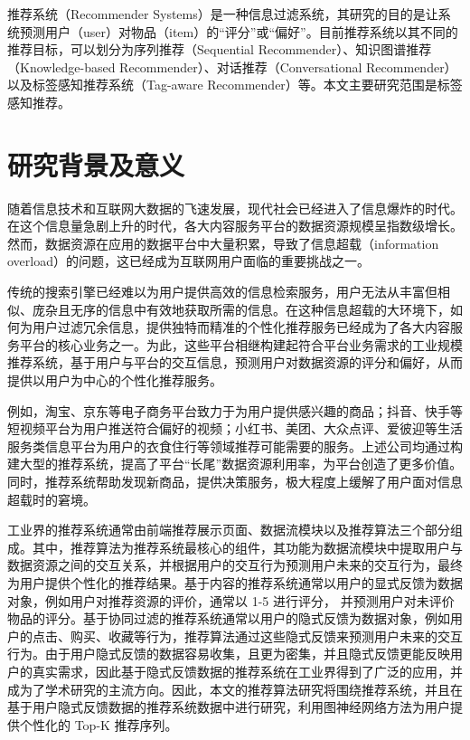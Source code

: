 推荐系统（Recommender Systems）是一种信息过滤系统，其研究的目的是让系统预测用户（user）对物品（item）的“评分”或“偏好”。目前推荐系统以其不同的推荐目标，可以划分为序列推荐（Sequential Recommender）、知识图谱推荐（Knowledge-based Recommender）、对话推荐（Conversational Recommender）以及标签感知推荐系统（Tag-aware Recommender）等。本文主要研究范围是标签感知推荐。
\section{研究背景及意义}
随着信息技术和互联网大数据的飞速发展，现代社会已经进入了信息爆炸的时代。在这个信息量急剧上升的时代，各大内容服务平台的数据资源规模呈指数级增长。然而，数据资源在应用的数据平台中大量积累，导致了信息超载（information overload）的问题，这已经成为互联网用户面临的重要挑战之一\cite{cn2022w}。

传统的搜索引擎已经难以为用户提供高效的信息检索服务，用户无法从丰富但相似、庞杂且无序的信息中有效地获取所需的信息。在这种信息超载的大环境下，如何为用户过滤冗余信息，提供独特而精准的个性化推荐服务已经成为了各大内容服务平台的核心业务之一。为此，这些平台相继构建起符合平台业务需求的工业规模推荐系统，基于用户与平台的交互信息，预测用户对数据资源的评分和偏好，从而提供以用户为中心的个性化推荐服务\cite{covington_deep_2016}。

例如，淘宝、京东等电子商务平台\cite{wang_billion-scale_2018}致力于为用户提供感兴趣的商品；抖音、快手等短视频平台\cite{liu_monolith_2022}为用户推送符合偏好的视频；小红书、美团、大众点评、爱彼迎等生活服务类信息平台\cite{grbovic_real-time_2018}为用户的衣食住行等领域推荐可能需要的服务。上述公司均通过构建大型的推荐系统，提高了平台“长尾”数据资源利用率，为平台创造了更多价值\cite{yin_challenging_2012}。同时，推荐系统帮助发现新商品，提供决策服务，极大程度上缓解了用户面对信息超载时的窘境。

工业界的推荐系统通常由前端推荐展示页面、数据流模块以及推荐算法三个部分组成。其中，推荐算法为推荐系统最核心的组件，其功能为数据流模块中提取用户与数据资源之间的交互关系，并根据用户的交互行为预测用户未来的交互行为，最终为用户提供个性化的推荐结果。基于内容的推荐系统通常以用户的显式反馈为数据对象，例如用户对推荐资源的评价，通常以 1-5 进行评分， 并预测用户对未评价物品的评分。基于协同过滤的推荐系统通常以用户的隐式反馈为数据对象，例如用户的点击、购买、收藏等行为，推荐算法通过这些隐式反馈来预测用户未来的交互行为\cite{rendle_bpr_2009}。由于用户隐式反馈的数据容易收集，且更为密集，并且隐式反馈更能反映用户的真实需求，因此基于隐式反馈数据的推荐系统在工业界得到了广泛的应用，并成为了学术研究的主流方向。因此，本文的推荐算法研究将围绕推荐系统，并且在基于用户隐式反馈数据的推荐系统数据中进行研究，利用图神经网络方法为用户提供个性化的 Top-K 推荐序列。

